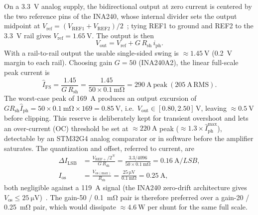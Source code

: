 \documentclass[journal,onecolumn,11pt]{IEEEtran}
\newcommand{\Rshunt}{R_{\mathrm{sh}}}
\begin{document}
On a \SI{3.3}{\volt} analog supply, the bidirectional output at zero current is centered by the two
reference pins of the INA240, whose internal divider sets the output midpoint at
$V_{\mathrm{ref}}=(V_{\mathrm{REF1}}+V_{\mathrm{REF2}})/2$~\cite{ina240ds}; tying REF1 to ground and
REF2 to the \SI{3.3}{\volt} rail gives $V_{\mathrm{ref}}=\SI{1.65}{\volt}$. The output is then
\begin{equation}
V_{\mathrm{out}} = V_{\mathrm{ref}} + G\,\Rshunt\,i_{\mathrm{ph}} .
\label{eq:csaout}
\end{equation}
With a rail-to-rail output the usable single-sided swing is $\approx\SI{1.45}{\volt}$ (\SI{0.2}{\volt}
margin to each rail). Choosing gain $G=50$ (INA240A2), the linear full-scale peak current is
\begin{equation}
\hat I_{\mathrm{FS}} = \frac{1.45}{G\,\Rshunt}
   = \frac{1.45}{50\times\SI{0.1}{\milli\ohm}} = \SI{290}{\ampere}\ \text{peak}\ (\SI{205}{\ampere}\,\text{RMS}).
\end{equation}
The worst-case peak of \SI{169}{\ampere} produces an output excursion of
$G\Rshunt\hat I_{\mathrm{ph}}=50\times\SI{0.1}{\milli\ohm}\times169=\SI{0.85}{\volt}$, i.e.\
$V_{\mathrm{out}}\in[0.80,2.50]\,\si{\volt}$, leaving $\approx\SI{0.5}{\volt}$ before clipping. This
reserve is deliberately kept for transient overshoot and lets an over-current (OC) threshold be set
at $\approx\SI{220}{\ampere}$ peak ($\approx1.3\times\hat I_{\mathrm{ph}}^{\max}$), detectable by an
STM32G4 analog comparator or in software before the amplifier saturates. The quantization and offset,
referred to current, are
\begin{align}
\Delta I_{\mathrm{LSB}} &= \frac{V_{\mathrm{REF+}}/2^{N}}{G\,\Rshunt}
   = \frac{3.3/4096}{50\times\SI{0.1}{\milli\ohm}} = \SI{0.16}{\ampere/LSB},\\
I_{\mathrm{os}} &= \frac{V_{\mathrm{os(max)}}}{\Rshunt} = \frac{\SI{25}{\micro\volt}}{\SI{0.1}{\milli\ohm}}
   = \SI{0.25}{\ampere},
\end{align}
both negligible against a \SI{119}{\ampere} signal (the INA240 zero-drift architecture gives
$V_{\mathrm{os}}\le\SI{25}{\micro\volt}$)~\cite{ina240ds}. The gain-50 / \SI{0.1}{\milli\ohm} pair is
therefore preferred over a gain-20 / \SI{0.25}{\milli\ohm} pair, which would dissipate
$\approx\SI{4.6}{\watt}$ per shunt for the same full scale.
\end{document}
